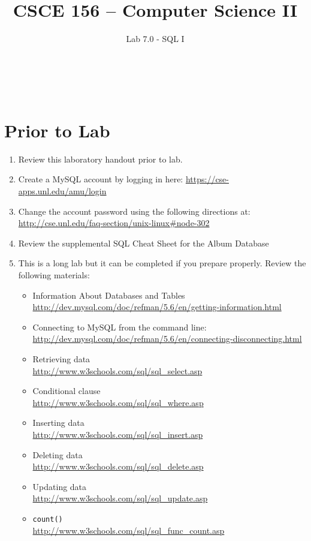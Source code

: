 \documentclass[12pt]{scrartcl}
\title{CSCE 156 -- Computer Science II}
\subtitle{Lab 7.0 - SQL I}
\author{~}
\date{~}
\begin{document}
\maketitle

\section*{Prior to Lab}

\begin{enumerate}
  \item Review this laboratory handout prior to lab.
  \item Create a MySQL account by logging in here: \url{https://cse-apps.unl.edu/amu/login}
  \item Change the account password using the following directions at: 
  	\url{http://cse.unl.edu/faq-section/unix-linux#node-302}
  \item Review the supplemental SQL Cheat Sheet for the Album Database
  \item This is a long lab but it can be completed if you prepare 
	properly.  Review the following materials:
  \begin{itemize}
    \item Information About Databases and Tables \\
    \url{http://dev.mysql.com/doc/refman/5.6/en/getting-information.html}
    \item Connecting to MySQL from the command line: \\ 
    \url{http://dev.mysql.com/doc/refman/5.6/en/connecting-disconnecting.html}
    \item Retrieving data\\ \url{http://www.w3schools.com/sql/sql_select.asp}
    \item Conditional clause	\\ \url{http://www.w3schools.com/sql/sql_where.asp} 
    \item Inserting data	\\ \url{http://www.w3schools.com/sql/sql_insert.asp} 
    \item Deleting data	\\ 
    \url{http://www.w3schools.com/sql/sql_delete.asp} 
    \item Updating data	\\ 
    \url{http://www.w3schools.com/sql/sql_update.asp} 
    \item \texttt{count()}	\\ 
    \url{http://www.w3schools.com/sql/sql_func_count.asp}

\end{itemize}
\end{enumerate}
\end{document}
